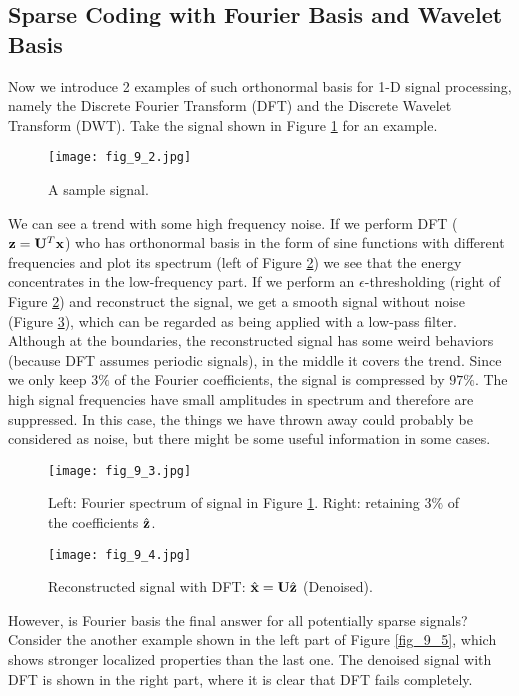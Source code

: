 \documentclass[../book-template.tex]{subfiles}
\begin{document}
\subsection{Sparse Coding with Fourier Basis and Wavelet Basis}
Now we introduce 2 examples of such orthonormal basis for 1-D signal processing, namely the Discrete Fourier Transform (DFT) and the Discrete Wavelet Transform (DWT). Take the signal shown in Figure \ref{fig_9_2} for an example.
\begin{figure}[h] 
	\centering 
	\texttt{[image: fig\_9\_2.jpg]} 
	\caption{A sample signal.}\label{fig_9_2}
\end{figure}
\par We can see a trend with some high frequency noise. If we perform DFT (${\bf z}={\bf U}^T{\bf x}$) who has orthonormal basis in the form of sine functions with different frequencies and plot its spectrum (left of Figure \ref{fig_9_3}) we see that the energy concentrates in the low-frequency part. If we perform an $\epsilon$-thresholding (right of Figure \ref{fig_9_3}) and reconstruct the signal, we get a smooth signal without noise (Figure \ref{fig_9_4}), which can be regarded as being applied with a low-pass filter. Although at the boundaries, the reconstructed signal has some weird behaviors (because DFT assumes periodic signals), in the middle it covers the trend. Since we only keep $3\%$ of the Fourier coefficients, the signal is compressed by $97\%$. The high signal frequencies have small amplitudes in spectrum and therefore are suppressed. In this case, the things we have thrown away could probably be considered as noise, but there might be some useful information in some cases.
\begin{figure}[h] 
	\centering 
	\texttt{[image: fig\_9\_3.jpg]} 
	\caption{Left: Fourier spectrum of signal in Figure \ref{fig_9_2}. Right: retaining $3\%$ of the coefficients $\hat{\bf z}$.}\label{fig_9_3}
\end{figure}
\begin{figure}[h] 
	\centering 
	\texttt{[image: fig\_9\_4.jpg]} 
	\caption{Reconstructed signal with DFT: $\hat{\bf x}={\bf U}\hat{\bf z}$ (Denoised).}\label{fig_9_4}
\end{figure}
\par However, is Fourier basis the final answer for all potentially sparse signals? Consider the another example shown in the left part of Figure \ref{fig_9_5}, which shows stronger localized properties than the last one. The denoised signal with DFT is shown in the right part, where it is clear that DFT fails completely.
\end{document}
